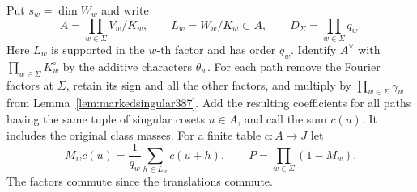 \documentclass[a4paper,11pt]{article}
\theoremstyle{definition}
\theoremstyle{remark}
\numberwithin{equation}{section}
\begin{document}
Put \(s_w=\dim W_w\) and write
\[
   A=\prod_{w\in\Sigma} V_w/K_w,\qquad
   L_w=W_w/K_w\subset A,\qquad D_\Sigma=\prod_{w\in\Sigma}q_w.
\]
Here \(L_w\) is supported in the \(w\)-th factor and has order
\(q_w\). Identify \(A^\vee\) with \(\prod_{w\in\Sigma}K_w^\circ\)
by the additive characters \(\theta_w\).
For each path remove the Fourier factors at \(\Sigma\), retain
its sign and all the other factors, and multiply by
\(\prod_{w\in\Sigma}\gamma_w\) from
Lemma~\ref{lem:markedsingular387}. Add the resulting
coefficients for all paths having the same tuple of singular
cosets \(u\in A\), and call the sum \(c(u)\). It includes
the original class masses. For a finite table \(c:A\to J\)
let
\[
  M_wc(u)=\frac1{q_w}\sum_{h\in L_w}c(u+h),\qquad
  P=\prod_{w\in\Sigma}(1-M_w).
\]
The factors commute since the translations commute.
\end{document}
